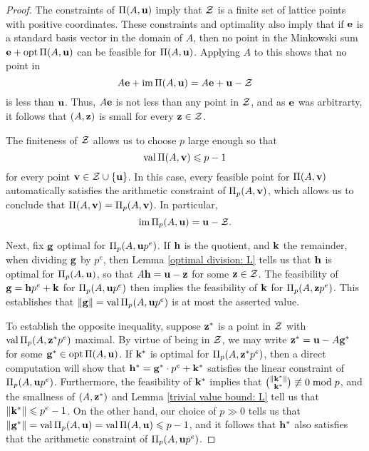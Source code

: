 \documentclass[11pt]{amsart}
\renewcommand{\!}[1]{{\color{red}\text{$\star$\,}#1\,$\star$}}
\begin{document}
\begin{proof}  The constraints of $\Pi(A, \mathbf{u})$ imply that $\mathcal{Z}$ is a finite set of lattice points with positive coordinates.   These constraints and optimality also imply that if $\mathbf{e}$ is a standard basis vector in the domain of $A$, then no point in the Minkowski sum $\mathbf{e} + \operatorname{opt} \Pi(A, \mathbf{u})$ can be feasible for $\Pi(A, \mathbf{u})$.  Applying $A$ to this shows that no point in 
\[ A \mathbf{e} + \operatorname{im} \Pi(A, \mathbf{u}) = A \mathbf{e} + \mathbf{u} - \mathcal{Z} \] 
is less than $\mathbf{u}$.  Thus, $A \mathbf{e}$ is not less than any point in $\mathcal{Z}$, and as $\mathbf{e}$ was arbitrarty, it follows that $(A, \mathbf{z})$ is small for every $\mathbf{z} \in \mathcal{Z}$.

The finiteness of $\mathcal{Z}$ allows us to choose $p$ large enough so that \[ \operatorname{val} \Pi(A, \mathbf{v}) \leqslant p -1 \] for every point $\mathbf{v} \in \mathcal{Z} \cup \{ \mathbf{u} \}$.  In this case, every feasible point for $\Pi(A, \mathbf{v})$  automatically satisfies the arithmetic constraint of $\Pi_p(A, \mathbf{v})$, which allows us to conclude that $\Pi(A, \mathbf{v}) = \Pi_p(A, \mathbf{v})$.  In particular, \[ \operatorname{im} \Pi_p(A, \mathbf{u}) =\mathbf{u} - \mathcal{Z}. \] 

Next, fix $\mathbf{g}$ optimal for $\Pi_p(A, \mathbf{u}p^e)$.  If $\mathbf{h}$ is the quotient, and $\mathbf{k}$ the remainder, when dividing $\mathbf{g}$ by $p^e$, then Lemma \ref{optimal division: L} tells us that $\mathbf{h}$ is optimal for $\Pi_p(A, \mathbf{u})$, so that $A \mathbf{h} = \mathbf{u}-\mathbf{z}$ for some $\mathbf{z} \in \mathcal{Z}$.  The feasibility of $\mathbf{g}=\mathbf{h}p^e + \mathbf{k}$ for $\Pi_p(A, \mathbf{u}p^e)$ then implies the feasibility of $\mathbf{k}$ for $\Pi_p(A, \mathbf{z}p^e)$.  This establishes that $\| \mathbf{g} \| = \operatorname{val} \Pi_p(A, \mathbf{u}p^e)$ is at most the asserted value.

To establish the opposite inequality, suppose $\mathbf{z}^{\ast}$ is a point in $\mathcal{Z}$ with $\operatorname{val} \Pi_p(A, \mathbf{z}^{\ast} p^e)$ maximal.  By virtue of being in $\mathcal{Z}$, we may write $\mathbf{z}^{\ast} = \mathbf{u} - A \mathbf{g}^{\ast}$ for some $\mathbf{g}^{\ast} \in \operatorname{opt} \Pi(A, \mathbf{u})$.  If $\mathbf{k}^{\ast}$ is optimal for $\Pi_p(A, \mathbf{z}^{\ast} p^e)$, then a direct computation will show that 
$\mathbf{h}^{\ast} = \mathbf{g}^{\ast} \cdot p^e + \mathbf{k}^{\ast}$ satisfies the linear constraint of  $\Pi_p(A, \mathbf{u}p^e)$.  Furthermore, the feasibility of $\mathbf{k}^{\ast}$ implies that $\binom{\| \mathbf{k}^{\ast} \|}{\mathbf{k}^{\ast}} \not \equiv 0 \bmod p$, and the smallness of $(A, \mathbf{z}^{\ast})$ and Lemma \ref{trivial value bound: L} tell us that $\| \mathbf{k}^{\ast} \| \leqslant p^e-1$.  On the other hand, our choice of $p \gg 0$ tells us that $\| \mathbf{g}^{\ast} \| = \operatorname{val} \Pi_p(A, \mathbf{u}) = \operatorname{val} \Pi(A, \mathbf{u}) \leqslant p-1$, and it follows that $\mathbf{h}^{\ast}$ also satisfies that the arithmetic constraint of $\Pi_p(A, \mathbf{u}p^e)$.
\end{proof}
\end{document}
